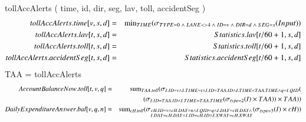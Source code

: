 tollAccAlerts ( time, id, dir, seg, lav, toll, accidentSeg )
\begin{eqnarray*}
tollAccAlerts.time[v,s,d] &=& \mathrm{min}_{TIME} ( \sigma_{TYPE =0 \;\wedge\; LANE <> 4 \;\wedge\; ID = v \;\wedge\; DIR = d \;\wedge\; SEG = s} (Input))\\
tollAccAlerts.lav[t,s,d] &=& Statistics.lav[t/60+1,s,d]\\
tollAccAlerts.toll[t,s,d] &=& Statistics.toll [t/60+1,s,d]\\
tollAccAlerts.accidentSeg[t,s,d] &=& Statistics.accidentSeg[t/60+1,s,d]\\
\end{eqnarray*}
TAA = tollAccAlerts
\begin{eqnarray*}
AccountBalanceNow.toll[t,v,q] &=&
\mathrm{sum}_{TAA.toll} (\sigma_{I.ID = v \wedge I.TIME = t \wedge I.ID = TAA.ID \wedge I.TIME < TAA.TIME \wedge q = I.QID} ( \\
&&(\sigma_{I.ID = TAA.ID \wedge I.TIME = TAA.TIME} 
(\sigma_{type = 2} (I) \times TAA))\times TAA))\\
DailyExpenditureAnswer.bal[v,q,n] &=& 
\mathrm{sum}_{cH.toll} ( \sigma_{\substack{cH.ID = v \wedge cH.DAY = n \wedge I.QID = q \wedge I.DAY = cH.DAY \wedge\\ I.DAY = cH.DAY \wedge I.ID = cH.ID \wedge I.XWAY = cH.XWAY}} ( \sigma_{type = 3} (I) \times cH))
\end{eqnarray*}
\pagebreak

